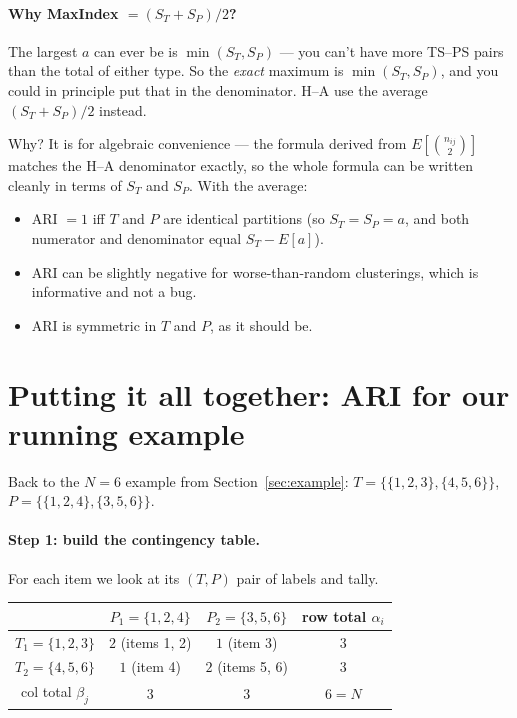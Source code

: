 \documentclass[11pt]{article}
\begin{document}
\paragraph{Why MaxIndex $= (S_T + S_P)/2$?}
The largest $a$ can ever be is $\min(S_T, S_P)$ --- you can't have more
TS--PS pairs than the total of either type. So the
\emph{exact} maximum is $\min(S_T, S_P)$, and you could in principle put
that in the denominator. H--A use the average $(S_T + S_P)/2$ instead.

Why? It is for algebraic convenience --- the formula derived from
$E[\binom{n_{ij}}{2}]$ matches the H--A denominator exactly, so the whole
formula can be written cleanly in terms of $S_T$ and $S_P$. With the
average:
\begin{itemize}\setlength\itemsep{1pt}
  \item ARI $= 1$ iff $T$ and $P$ are identical partitions (so
        $S_T = S_P = a$, and both numerator and denominator equal
        $S_T - E[a]$).
  \item ARI can be slightly negative for worse-than-random clusterings,
        which is informative and not a bug.
  \item ARI is symmetric in $T$ and $P$, as it should be.
\end{itemize}

\section{Putting it all together: ARI for our running example}

Back to the $N = 6$ example from Section~\ref{sec:example}:
$T = \{\{1,2,3\}, \{4,5,6\}\}$,
$P = \{\{1,2,4\}, \{3,5,6\}\}$.

\paragraph{Step 1: build the contingency table.}
For each item we look at its $(T, P)$ pair of labels and tally.

\begin{table}[H]
\centering
\small
\begin{tabular}{c | c c | c}
& $P_1 = \{1, 2, 4\}$ & $P_2 = \{3, 5, 6\}$ & row total $\alpha_i$ \\
\hline
$T_1 = \{1, 2, 3\}$ & $2$ \; (items 1, 2) & $1$ \; (item 3) & $3$ \\
$T_2 = \{4, 5, 6\}$ & $1$ \; (item 4) & $2$ \; (items 5, 6) & $3$ \\
\hline
col total $\beta_j$ & $3$ & $3$ & $6 = N$ \\
\end{tabular}
\end{table}
\end{document}
